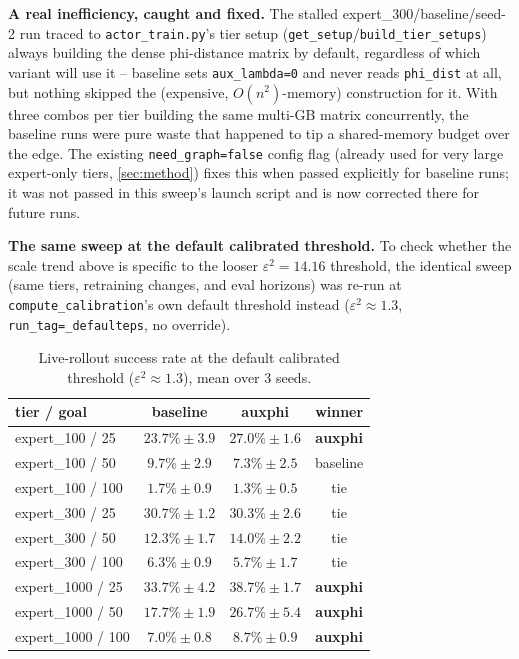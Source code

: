 \documentclass[11pt]{article}
\begin{document}
\textbf{A real inefficiency, caught and fixed.} The stalled expert\_300/baseline/seed-2 run
traced to \texttt{actor\_train.py}'s tier setup (\texttt{get\_setup}/\texttt{build\_tier\_setups})
always building the dense phi-distance matrix by default, regardless of which variant will use
it -- baseline sets \texttt{aux\_lambda=0} and never reads \texttt{phi\_dist} at all, but
nothing skipped the (expensive, $O(n^2)$-memory) construction for it. With three combos per
tier building the same multi-GB matrix concurrently, the baseline runs were pure waste that
happened to tip a shared-memory budget over the edge. The existing \texttt{need\_graph=false}
config flag (already used for very large expert-only tiers, \cref{sec:method}) fixes this when
passed explicitly for baseline runs; it was not passed in this sweep's launch script and is now
corrected there for future runs.

\textbf{The same sweep at the default calibrated threshold.} To check whether the scale trend
above is specific to the looser $\varepsilon^2=14.16$ threshold, the identical sweep (same
tiers, retraining changes, and eval horizons) was re-run at \texttt{compute\_calibration}'s own
default threshold instead ($\varepsilon^2 \approx 1.3$, \texttt{run\_tag=\_defaulteps}, no
override).

\begin{table}[h]
\centering
\small
\caption{Live-rollout success rate at the default calibrated threshold ($\varepsilon^2 \approx
1.3$), mean over 3 seeds.}
\begin{tabular}{lccc}
\toprule
tier / goal & baseline & \textbf{auxphi} & winner \\
\midrule
expert\_100 / 25  & $23.7\% \pm 3.9$ & $\mathbf{27.0\%} \pm 1.6$ & \textbf{auxphi} \\
expert\_100 / 50  & $\mathbf{9.7\%} \pm 2.9$  & $7.3\% \pm 2.5$  & baseline \\
expert\_100 / 100 & $1.7\% \pm 0.9$  & $1.3\% \pm 0.5$  & tie \\
\addlinespace
expert\_300 / 25  & $30.7\% \pm 1.2$ & $30.3\% \pm 2.6$ & tie \\
expert\_300 / 50  & $12.3\% \pm 1.7$ & $14.0\% \pm 2.2$ & tie \\
expert\_300 / 100 & $6.3\% \pm 0.9$  & $5.7\% \pm 1.7$  & tie \\
\addlinespace
expert\_1000 / 25  & $33.7\% \pm 4.2$ & $\mathbf{38.7\%} \pm 1.7$ & \textbf{auxphi} \\
expert\_1000 / 50  & $17.7\% \pm 1.9$ & $\mathbf{26.7\%} \pm 5.4$ & \textbf{auxphi} \\
expert\_1000 / 100 & $7.0\% \pm 0.8$  & $\mathbf{8.7\%} \pm 0.9$  & \textbf{auxphi} \\
\bottomrule
\end{tabular}
\end{table}
\end{document}
